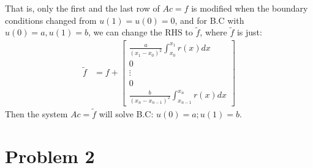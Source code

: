 \documentclass[]{article}
\begin{document}
        That is, only the first and the last row of $Ac = f$ is modified when the boundary conditions changed from $u(1) = u(0) = 0$, and for B.C with $u(0) = a, u(1) = b$, we can change the RHS to $\tilde{f}$, where $\tilde{f}$ is just: 
        \begin{align*}\tag{1.e.6}\label{eqn:1.e.6}
            \tilde{f} &= 
            f + 
            \begin{bmatrix}
                \frac{a}{(x_1 - x_0)^2}\int_{x_0}^{x_1} 
                    r(x)
                dx
                \\
                0
                \\
                \vdots 
                \\
                0 
                \\
                \frac{b}{(x_n - x_{n - 1})^2}\int_{x_{n - 1}}^{x_n} 
                r(x)
                dx
            \end{bmatrix}
        \end{align*}
        Then the system $Ac = \tilde{f}$ will solve B.C: $u(0) = a; u(1) = b$. 
    

\section*{Problem 2}
\end{document}
